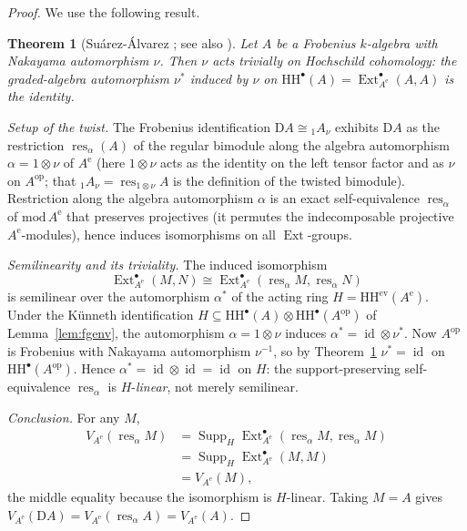 \documentclass[11pt]{amsart}
\newtheorem{theorem}{Theorem}[section]
\theoremstyle{definition}
\newcommand{\HH}{\mathrm{HH}}
\newcommand{\D}{\mathrm{D}}
\newcommand{\Ext}{\operatorname{Ext}}
\newcommand{\id}{\operatorname{id}}
\newcommand{\Ae}{A^{\mathrm{e}}}
\newcommand{\Supp}{\operatorname{Supp}}
\newcommand{\kk}{k}
\newcommand{\ev}{\mathrm{ev}}
\begin{document}
\begin{proof}
We use the following result.

\begin{theorem}[{Su\'arez-\'Alvarez \cite{SuarezAlvarez}; see also
\cite[Cor.~6.3]{ArmCox}}]\label{thm:SuA}
Let $A$ be a Frobenius $\kk$-algebra with Nakayama automorphism $\nu$. Then
$\nu$ acts trivially on Hochschild cohomology: the graded-algebra automorphism
$\nu^*$ induced by $\nu$ on $\HH^\bullet(A)=\Ext^\bullet_{\Ae}(A,A)$ is the
identity.
\end{theorem}

\emph{Setup of the twist.} The Frobenius identification $\D A\cong{}_1A_\nu$
exhibits $\D A$ as the restriction $\operatorname{res}_\alpha(A)$ of the regular
bimodule along the algebra automorphism $\alpha=1\otimes\nu$ of $\Ae$ (here
$1\otimes\nu$ acts as the identity on the left tensor factor and as $\nu$ on
$A^{\mathrm{op}}$; that ${}_1A_\nu=\operatorname{res}_{1\otimes\nu}A$ is the
definition of the twisted bimodule). Restriction along the algebra
automorphism $\alpha$ is an exact self-equivalence $\operatorname{res}_\alpha$
of $\mathrm{mod}\,\Ae$ that preserves projectives (it permutes the
indecomposable projective $\Ae$-modules), hence induces isomorphisms on all
$\Ext$-groups.

\emph{Semilinearity and its triviality.} The induced isomorphism
\[
\Ext^\bullet_{\Ae}(M,N)\cong\Ext^\bullet_{\Ae}(\operatorname{res}_\alpha M,
\operatorname{res}_\alpha N)
\]
is semilinear over the automorphism
$\alpha^*$ of the acting ring $H=\HH^{\ev}(\Ae)$. Under the K\"unneth
identification $H\subseteq\HH^\bullet(A)\otimes\HH^\bullet(A^{\mathrm{op}})$ of
Lemma~\ref{lem:fgenv}, the automorphism $\alpha=1\otimes\nu$ induces
$\alpha^*=\id\otimes\nu^*$. Now $A^{\mathrm{op}}$ is Frobenius with Nakayama
automorphism $\nu^{-1}$, so by Theorem~\ref{thm:SuA} $\nu^*=\id$ on
$\HH^\bullet(A^{\mathrm{op}})$. Hence $\alpha^*=\id\otimes\id=\id$ on $H$: the
support-preserving self-equivalence $\operatorname{res}_\alpha$ is
$H$-\emph{linear}, not merely semilinear.

\emph{Conclusion.} For any $M$, 
\begin{align*}
    V_{\Ae}(\operatorname{res}_\alpha M)
& =\Supp_H\Ext^\bullet_{\Ae}(\operatorname{res}_\alpha M,\operatorname{res}_\alpha M) \\
&=\Supp_H\Ext^\bullet_{\Ae}(M,M)\\ &=V_{\Ae}(M), 
\end{align*}
the middle equality because the
isomorphism is $H$-linear. Taking $M=A$ gives
$V_{\Ae}(\D A)=V_{\Ae}(\operatorname{res}_\alpha A)=V_{\Ae}(A)$.
\end{proof}
\end{document}
